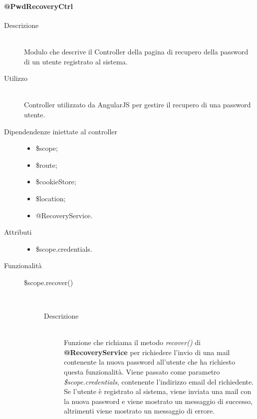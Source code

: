 \paragraph{@PwdRecoveryCtrl}
\begin{description}
	\item[Descrizione] \hfill \\
	Modulo che descrive il Controller della pagina di recupero della password di un utente registrato al sistema.
	\item[Utilizzo] \hfill \\
	Controller utilizzato da AngularJS per gestire il recupero di una password utente.
	\item[Dipendendenze iniettate al controller] \hfill
	\begin{itemize}
		\item \$scope;
		\item \$route;
		\item \$cookieStore;
		\item \$location;
		\item @RecoveryService.
	\end{itemize}
	\item[Attributi] \hfill
	\begin{itemize}
		\item \$scope.credentials.
	\end{itemize}
	\item[Funzionalità] \hfill
	\begin{description}
  		\item[\$scope.recover()] \hfill \\
  		\begin{description}
  			\item[Descrizione] \hfill \\
  			Funzione che richiama il metodo \textit{recover()} di \textbf{@RecoveryService} per richiedere l'invio di una mail contenente la nuova password all'utente che ha richiesto questa funzionalità. Viene passato come parametro \textit{\$scope.credentials}, contenente l'indirizzo email del richiedente. Se l'utente è registrato al sistema, viene inviata una mail con la nuova password e viene mostrato un messaggio di successo, altrimenti viene mostrato un messaggio di errore.
  		\end{description}
  	\end{description}
\end{description}

